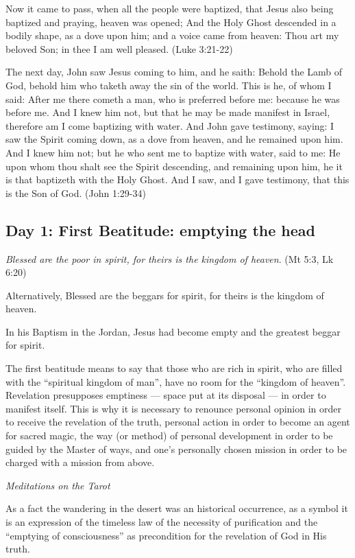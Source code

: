 Now it came to pass, when all the people were baptized, that Jesus also being baptized and praying, heaven was opened;
And the Holy Ghost descended in a bodily shape, as a dove upon him; and a voice came from heaven: Thou art my beloved
Son; in thee I am well pleased. (Luke 3:21-22)

The next day, John saw Jesus coming to him, and he saith: Behold the Lamb of God, behold him who taketh away the sin of
the world. This is he, of whom I said: After me there cometh a man, who is preferred before me: because he was before
me. And I knew him not, but that he may be made manifest in Israel, therefore am I come baptizing with water. And John
gave testimony, saying: I saw the Spirit coming down, as a dove from heaven, and he remained upon him. And I knew him
not; but he who sent me to baptize with water, said to me: He upon whom thou shalt see the Spirit descending, and
remaining upon him, he it is that baptizeth with the Holy Ghost. And I saw, and I gave testimony, that this is the Son
of God. (John 1:29-34)

\subsection*{Day 1: First Beatitude: emptying the head}
\emph{Blessed are the poor in spirit, for theirs is the kingdom of heaven}. (Mt 5:3, Lk 6:20)

Alternatively, Blessed are the beggars for spirit, for theirs is the kingdom of heaven.

In his Baptism in the Jordan, Jesus had become empty and the greatest beggar for spirit.

\begin{quotationx}
The first beatitude means to say that those who are rich in spirit, who are filled with the “spiritual kingdom of man”,
have no room for the “kingdom of heaven”. Revelation presupposes emptiness — space put at its
disposal — in order to manifest itself. This is why it is necessary to renounce personal opinion
in order to receive the revelation of the truth, personal action in order to become an agent for sacred magic, the way
(or method) of personal development in order to be guided by the Master of ways, and one's
personally chosen mission in order to be charged with a mission from above.
\begin{flushright}\textit{Meditations on the Tarot}\end{flushright} 

\end{quotationx}
As a fact the wandering in the desert was an historical occurrence, as a symbol it is an expression of the timeless law
of the necessity of purification and the “emptying of consciousness” as precondition for the revelation of God in His
truth.

